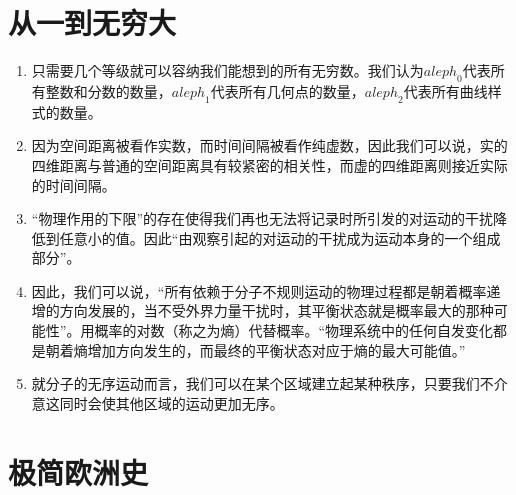 \documentclass[UTF8]{ctexart}
\begin{document}
	\newpage
	
	\section{从一到无穷大}
		
		\begin{enumerate}
			
			\item 只需要几个等级就可以容纳我们能想到的所有无穷数。我们认为${aleph}_{0}$代表所有整数和分数的数量，${aleph}_{1}$代表所有几何点的数量，${aleph}_{2}$代表所有曲线样式的数量。          
			
			\item 因为空间距离被看作实数，而时间间隔被看作纯虚数，因此我们可以说，实的四维距离与普通的空间距离具有较紧密的相关性，而虚的四维距离则接近实际的时间间隔。
			
			\item “物理作用的下限”的存在使得我们再也无法将记录时所引发的对运动的干扰降低到任意小的值。因此“由观察引起的对运动的干扰成为运动本身的一个组成部分”。
			
			\item 因此，我们可以说，“所有依赖于分子不规则运动的物理过程都是朝着概率递增的方向发展的，当不受外界力量干扰时，其平衡状态就是概率最大的那种可能性”。用概率的对数（称之为熵）代替概率。“物理系统中的任何自发变化都是朝着熵增加方向发生的，而最终的平衡状态对应于熵的最大可能值。”
			
			\item 就分子的无序运动而言，我们可以在某个区域建立起某种秩序，只要我们不介意这同时会使其他区域的运动更加无序。
			
		\end{enumerate}
	
	\newpage
	
	
	\section{极简欧洲史}
	
		
\end{document}
